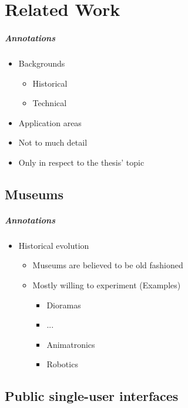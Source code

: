 \chapter{Related Work}
\label{related_work}

\paragraph{Annotations}

\begin{itemize}
	\item Backgrounds
	\begin{itemize}
		\item Historical
		\item Technical
	\end{itemize}
	\item Application areas
	\\
	\item Not to much detail
	\item Only in respect to the thesis' topic
\end{itemize}

\section{Museums}
\label{related_work_museums}

\paragraph{Annotations}

\begin{itemize}
	\item Historical evolution
	\begin{itemize}
		\item Museums are believed to be old fashioned
		\item Mostly willing to experiment (Examples)
		\begin{itemize}
			\item Dioramas
			\item ...
			\item Animatronics
			\item Robotics
		\end{itemize}
	\end{itemize}
\end{itemize}



\section{Public single-user interfaces}
\label{related_work_single}


